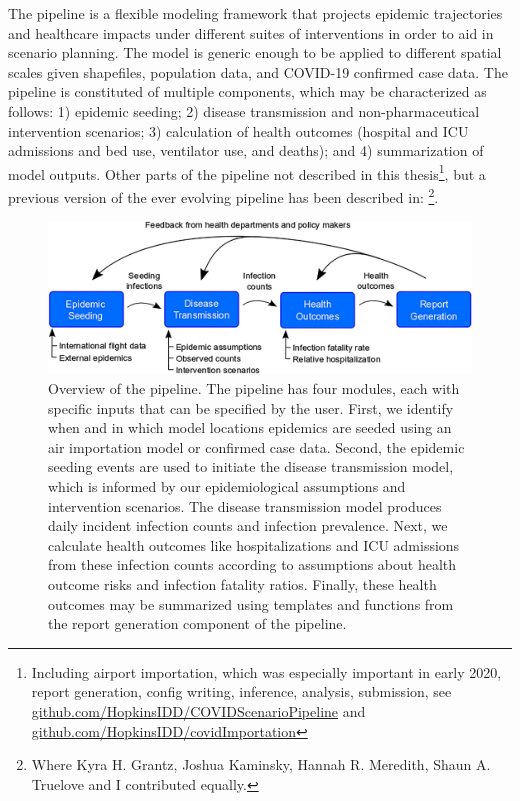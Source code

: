 The pipeline is a flexible modeling framework that projects epidemic trajectories and healthcare impacts under different suites of interventions in order to aid in scenario planning. The model is generic enough to be applied to different spatial scales given shapefiles, population data, and COVID-19 confirmed case data. The pipeline is constituted of multiple components, which may be characterized as follows: 1) epidemic seeding; 2) disease transmission and non-pharmaceutical intervention scenarios; 3) calculation of health outcomes (hospital and ICU admissions and bed use, ventilator use, and deaths); and 4) summarization of model outputs.
 Other parts of the pipeline not described in this thesis\footnote[][-4\baselineskip]{Including airport importation, which was especially important in early 2020, report generation, config writing, inference, analysis, submission, see \eg \url{github.com/HopkinsIDD/COVIDScenarioPipeline} and \url{github.com/HopkinsIDD/covidImportation}}, but a previous version of the ever evolving pipeline has been described in:
\footnote[][-2\baselineskip]{Where Kyra H. Grantz, Joshua Kaminsky, Hannah R. Meredith, Shaun A. Truelove and I contributed equally.}.
\begin{figure}[!htb]%
    \centering
    \includegraphics{fig_pipeline/fig1a}
    \caption[Overview of the pipeline.]{Overview of the pipeline. The pipeline has four modules, each with specific inputs that can be specified by the user. First, we identify when and in which model locations epidemics are seeded using an air importation model or confirmed case data. Second, the epidemic seeding events are used to initiate the disease transmission model, which is informed by our epidemiological assumptions and intervention scenarios. The disease transmission model produces daily incident infection counts and infection prevalence. Next, we calculate health outcomes like hospitalizations and ICU admissions from these infection counts according to assumptions about health outcome risks and infection fatality ratios. Finally, these health outcomes may be summarized using templates and functions from the report generation component of the pipeline.}
    \label{fig:pipeline-modules}
\end{figure}

